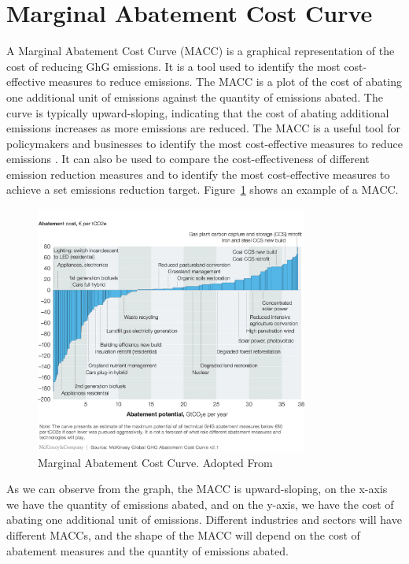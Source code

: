 \section{Marginal Abatement Cost Curve}
\label{sec:MACC}

A Marginal Abatement Cost Curve (MACC) is a graphical representation of the cost of reducing GhG emissions. It is a tool used to identify the most cost-effective measures to reduce emissions. The MACC is a plot of the cost of abating one additional unit of emissions against the quantity of emissions abated. The curve is typically upward-sloping, indicating that the cost of abating additional emissions increases as more emissions are reduced. The MACC is a useful tool for policymakers and businesses to identify the most cost-effective measures to reduce emissions \cite{McKinsey2017}. It can also be used to compare the cost-effectiveness of different emission reduction measures and to identify the most cost-effective measures to achieve a set emissions reduction target. Figure~\ref{fig:macc} shows an example of a MACC.

\begin{figure}[H]
\centering
\includegraphics[width=0.8\textwidth]{figures/marginal_abatement_cost_curve.png}
\caption{Marginal Abatement Cost Curve. Adopted From \cite{McKinsey2017}}
\label{fig:macc}
\end{figure}
\noindent As we can observe from the graph, the MACC is upward-sloping, on the x-axis we have the quantity of emissions abated, and on the y-axis, we have the cost of abating one additional unit of emissions. Different industries and sectors will have different MACCs, and the shape of the MACC will depend on the cost of abatement measures and the quantity of emissions abated.

